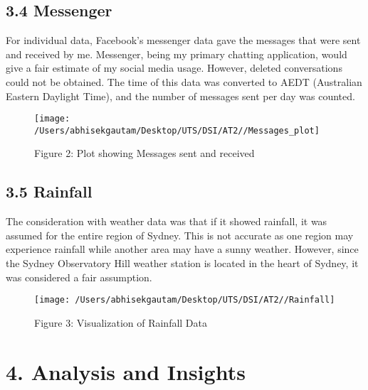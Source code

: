 \documentclass[
]{article}
\begin{document}
\hypertarget{messenger}{%
\subsection{3.4 Messenger}\label{messenger}}

For individual data, Facebook's messenger data gave the messages that
were sent and received by me. Messenger, being my primary chatting
application, would give a fair estimate of my social media usage.
However, deleted conversations could not be obtained. The time of this
data was converted to AEDT (Australian Eastern Daylight Time), and the
number of messages sent per day was counted.

\begin{figure}

{\centering \texttt{[image: /Users/abhisekgautam/Desktop/UTS/DSI/AT2//Messages\_plot]} 

}

\caption{\label{fig:figs}Figure 2: Plot showing Messages sent and received}\label{fig:add_picture2}
\end{figure}

\hypertarget{rainfall}{%
\subsection{3.5 Rainfall}\label{rainfall}}

The consideration with weather data was that if it showed rainfall, it
was assumed for the entire region of Sydney. This is not accurate as one
region may experience rainfall while another area may have a sunny
weather. However, since the Sydney Observatory Hill weather station is
located in the heart of Sydney, it was considered a fair assumption.

\begin{figure}

{\centering \texttt{[image: /Users/abhisekgautam/Desktop/UTS/DSI/AT2//Rainfall]} 

}

\caption{\label{fig:figs}Figure 3: Visualization of Rainfall Data}\label{fig:add_picture3}
\end{figure}

\hypertarget{analysis-and-insights}{%
\section{4. Analysis and Insights}\label{analysis-and-insights}}
\end{document}
